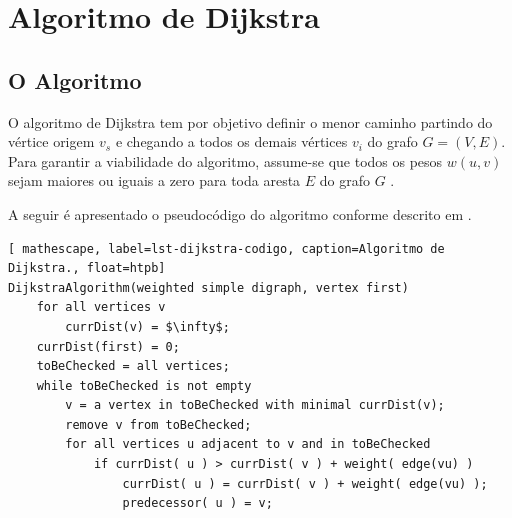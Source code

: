 \chapter{Algoritmo de Dijkstra}
\label{sec-dijkstra}

\section{O Algoritmo}
\label{sec-dijkstra-algoritmo}
O algoritmo de Dijkstra tem por objetivo definir o menor caminho partindo do vértice origem $v_{s}$ e chegando a todos os demais vértices $v_{i}$ do grafo $G = (V,E)$. Para garantir a viabilidade do algoritmo, assume-se que todos os pesos $w( u, v )$ sejam maiores ou iguais a zero para toda aresta $E$ do grafo $G$ \cite{cormen2009introduction}.

A seguir é apresentado o pseudocódigo do algoritmo conforme descrito em .

\begin{lstlisting}[ mathescape, label=lst-dijkstra-codigo, caption=Algoritmo de Dijkstra., float=htpb]
DijkstraAlgorithm(weighted simple digraph, vertex first)
	for all vertices v
		currDist(v) = $\infty$;
	currDist(first) = 0;
	toBeChecked = all vertices;
	while toBeChecked is not empty
		v = a vertex in toBeChecked with minimal currDist(v);
		remove v from toBeChecked;
		for all vertices u adjacent to v and in toBeChecked
			if currDist( u ) > currDist( v ) + weight( edge(vu) )
				currDist( u ) = currDist( v ) + weight( edge(vu) );
				predecessor( u ) = v;
\end{lstlisting}


